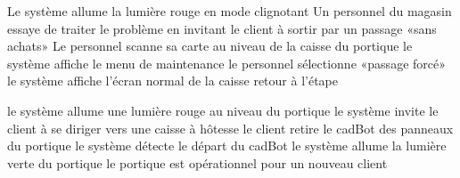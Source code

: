   \etape Le système allume la lumière rouge en mode clignotant 
  \etape Un personnel du magasin essaye de traiter le problème en invitant le client à sortir par un passage «sans achats»
  \etape Le personnel scanne sa carte au niveau de la caisse du portique
  \etape le système affiche le menu de maintenance
  \etape le personnel sélectionne «passage forcé»
  \etape le système affiche l'écran normal de la caisse
  \etape retour à l'étape 
\stopcondition
\stopalternatif

\exception
{} 
  \etape le système allume une lumière rouge au niveau du portique
  \etape le système invite le client à se diriger vers une caisse à hôtesse
  \etape le client retire le cadBot des panneaux du portique
  \etape le système détecte le départ du cadBot
  \etape le système allume la lumière verte du portique
\stopcondition
\postcondition le portique est opérationnel pour un nouveau client
\stopalternatif

\stopCU
